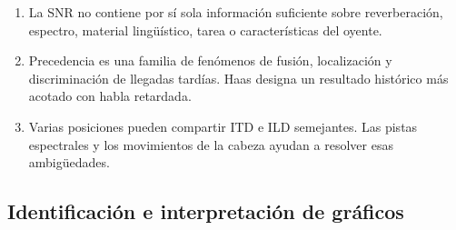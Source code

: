 \begin{enumerate}[label=\textbf{C\arabic*.},leftmargin=*]
    \item La SNR no contiene por sí sola información suficiente sobre
    reverberación, espectro, material lingüístico, tarea o características del
    oyente.

    \item Precedencia es una familia de fenómenos de fusión, localización y
    discriminación de llegadas tardías. Haas designa un resultado histórico
    más acotado con habla retardada.

    \item Varias posiciones pueden compartir ITD e ILD semejantes. Las pistas
    espectrales y los movimientos de la cabeza ayudan a resolver esas
    ambigüedades.
\end{enumerate}

\subsection*{Identificación e interpretación de gráficos}


